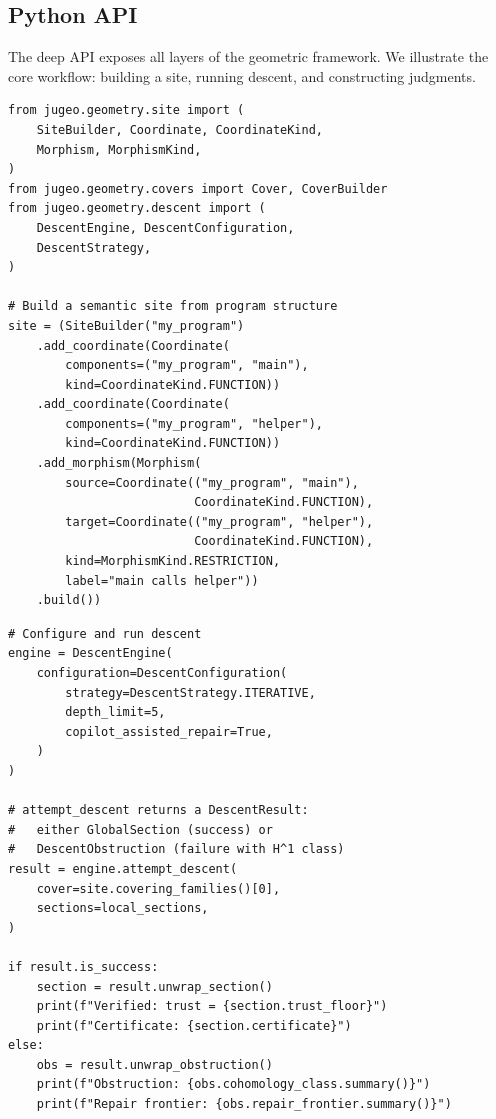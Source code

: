 \subsection{Python API}\label{sec:api}

The deep API exposes all layers of the geometric framework.  We
illustrate the core workflow: building a site, running descent, and
constructing judgments.

\begin{lstlisting}[style=jugeo-python,
  caption={Site construction via the \Python{} API.},
  label={lst:api-site}]
from jugeo.geometry.site import (
    SiteBuilder, Coordinate, CoordinateKind,
    Morphism, MorphismKind,
)
from jugeo.geometry.covers import Cover, CoverBuilder
from jugeo.geometry.descent import (
    DescentEngine, DescentConfiguration,
    DescentStrategy,
)

# Build a semantic site from program structure
site = (SiteBuilder("my_program")
    .add_coordinate(Coordinate(
        components=("my_program", "main"),
        kind=CoordinateKind.FUNCTION))
    .add_coordinate(Coordinate(
        components=("my_program", "helper"),
        kind=CoordinateKind.FUNCTION))
    .add_morphism(Morphism(
        source=Coordinate(("my_program", "main"),
                          CoordinateKind.FUNCTION),
        target=Coordinate(("my_program", "helper"),
                          CoordinateKind.FUNCTION),
        kind=MorphismKind.RESTRICTION,
        label="main calls helper"))
    .build())
\end{lstlisting}

\begin{lstlisting}[style=jugeo-python,
  caption={Running descent and inspecting results.},
  label={lst:api-descent}]
# Configure and run descent
engine = DescentEngine(
    configuration=DescentConfiguration(
        strategy=DescentStrategy.ITERATIVE,
        depth_limit=5,
        copilot_assisted_repair=True,
    )
)

# attempt_descent returns a DescentResult:
#   either GlobalSection (success) or
#   DescentObstruction (failure with H^1 class)
result = engine.attempt_descent(
    cover=site.covering_families()[0],
    sections=local_sections,
)

if result.is_success:
    section = result.unwrap_section()
    print(f"Verified: trust = {section.trust_floor}")
    print(f"Certificate: {section.certificate}")
else:
    obs = result.unwrap_obstruction()
    print(f"Obstruction: {obs.cohomology_class.summary()}")
    print(f"Repair frontier: {obs.repair_frontier.summary()}")
\end{lstlisting}

